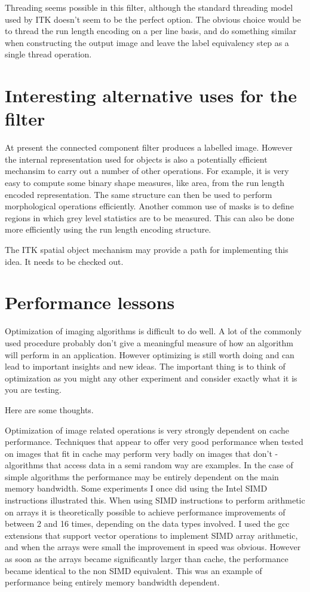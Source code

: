 \documentclass{InsightArticle}
\begin{document}
Threading seems possible in this filter, although the standard
threading model used by ITK doesn't seem to be the perfect option. The
obvious choice would be to thread the run length encoding on a per
line basis, and do something similar when constructing the output
image and leave the label equivalency step as a single thread
operation.

\section{Interesting alternative uses for the filter}
At present the connected component filter produces a labelled
image. However the internal representation used for objects is also a
potentially efficient mechansim to carry out a number of other
operations. For example, it is very easy to compute some binary shape
measures, like area, from the run length encoded representation. The
same structure can then be used to perform morphological operations
efficiently. Another common use of masks is to define regions in which
grey level statistics are to be measured. This can also be done more
efficiently using the run length encoding structure.

The ITK spatial object mechanism may provide a path for implementing
this idea. It needs to be checked out.

\section{Performance lessons}
\label{sect:performance_lessons}
Optimization of imaging algorithms is difficult to do well. A lot of
the commonly used procedure probably don't give a meaningful measure
of how an algorithm will perform in an application. However optimizing
is still worth doing and can lead to important insights and new
ideas. The important thing is to think of optimization as you might
any other experiment and consider exactly what it is you are testing.

Here are some thoughts.

Optimization of image related operations is very strongly dependent on
cache performance. Techniques that appear to offer very good
performance when tested on images that fit in cache may perform very
badly on images that don't - algorithms that access data in a semi
random way are examples. In the case of simple algorithms the
performance may be entirely dependent on the main memory
bandwidth. Some experiments I once did using the Intel SIMD
instructions illustrated this. When using SIMD instructions to perform
arithmetic on arrays it is theoretically possible to achieve
performance improvements of between 2 and 16 times, depending on the
data types involved. I used the gcc extensions that support vector
operations to implement SIMD array arithmetic, and when the arrays
were small the improvement in speed was obvious. However as soon as
the arrays became significantly larger than cache, the performance
became identical to the non SIMD equivalent. This was an example of
performance being entirely memory bandwidth dependent.
\end{document}
